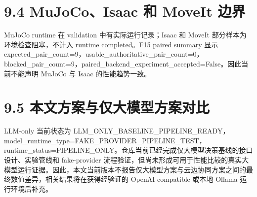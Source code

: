 \section{9.4 MuJoCo、Isaac 和 MoveIt 边界}

MuJoCo runtime 在 validation 中有实际运行记录；Isaac 和 MoveIt 部分样本为环境检查阻塞，不计入 runtime completed。F15 paired summary 显示 expected\_pair\_count=9，usable\_authoritative\_pair\_count=0，blocked\_pair\_count=9，paired\_backend\_experiment\_accepted=False。因此当前不能声明 MuJoCo 与 Isaac 的性能趋势一致。\par

\section{9.5 本文方案与仅大模型方案对比}

LLM-only 当前状态为 LLM\_ONLY\_BASELINE\_PIPELINE\_READY，model\_runtime\_type=FAKE\_PROVIDER\_PIPELINE\_TEST，runtime\_status=PIPELINE\_ONLY。仓库当前已经完成仅大模型决策基线的接口设计、实验管线和 fake-provider 流程验证，但尚未形成可用于性能比较的真实大模型运行证据。因此，本文当前版本不报告仅大模型方案与云边协同方案之间的最终数值差异，相关结果将在获得经验证的 OpenAI-compatible 或本地 Ollama 运行环境后补充。\par
